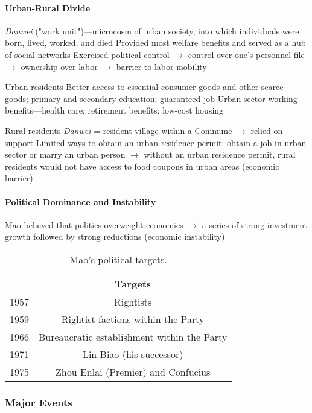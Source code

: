 \documentclass[11pt]{article}
\theoremstyle{definition}
\theoremstyle{remark}
\begin{document}
\paragraph{Urban-Rural Divide}
\begin{outline}[enumerate]
\1 \textit{Danwei} ("work unit")---microcosm of urban society, into which individuals were born, lived, worked, and died
	\2 Provided most welfare benefits and served as a hub of social networks
	\2 Exercised political control $\to$ control over one's personnel file $\to$ ownership over labor $\to$ barrier to labor mobility

\1 Urban residents
	\2 Better access to essential consumer goods and other scarce goods; primary and secondary education; guaranteed job
	\2 Urban sector working benefits---health care; retirement benefits; low-cost housing

\1 Rural residents
	\2 \textit{Danwei} = resident village within a Commune $\to$ relied on support
	\2 Limited ways to obtain an urban residence permit: obtain a job in urban sector or marry an urban person $\to$ without an urban residence permit, rural residents would not have access to food coupons in urban areas (economic barrier)
\end{outline}

\paragraph{Political Dominance and Instability} Mao believed that politics overweight economics $\to$ a series of strong investment growth followed by strong reductions (economic instability)
\begin{table}[ht]
\centering
\caption{Mao's political targets.}
\begin{tabular}[t]{lc}
\toprule
&Targets\\
\midrule
1957&Rightists\\
1959&Rightist factions within the Party\\
1966&Bureaucratic establishment within the Party\\
1971&Lin Biao (his successor)\\
1975&Zhou Enlai (Premier) and Confucius\\
\bottomrule
\end{tabular}
\end{table}%

\subsubsection{Major Events}
\end{document}
